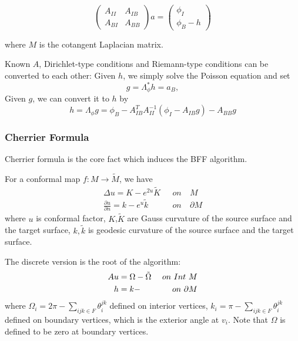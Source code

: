 \begin{equation}
\left(\begin{matrix}
A_{II} & A_{IB}\\
A_{BI} & A_{BB}
\end{matrix}\right) a
= \left(\begin{matrix}
\phi_I\\
\phi_B - h\end{matrix}\right)
\label{eq:relation}
\end{equation}

where $M$ is the cotangent Laplacian matrix.

Known $A$, Dirichlet-type conditions and Riemann-type conditions can be converted to each other: Given $h$, we simply solve the Poisson equation and set 
\begin{equation}
g = \Lambda^*_\phi h = a_B,
\end{equation}
Given $g$, we can convert it to $h$  by
\begin{equation}
h = \Lambda_\phi g = \phi_B - A_{IB}^TA_{II}^{-1}(\phi_I - A_{IB}g) - A_{BB}g
\end{equation}


\subsubsection{Cherrier Formula}
Cherrier formula \cite{CHERRIER1984154} is the core fact which induces the BFF algorithm. 

For a conformal map $f: M \rightarrow \tilde{M}$, we have 
\begin{equation}
\begin{split}
\Delta u = K - e^{2u} \tilde{K} \ \ \ &on\ &M\,\\
\frac{\partial u}{\partial n} = k - e^{u}\tilde{k} \ \ \ &on\     &\partial M
\end{split}
\end{equation}
where $u$ is conformal factor, $K$,$\tilde{K}$ are Gauss curvature of the source surface and  the target surface, $k, \tilde{k}$ is geodesic curvature of the source surface and the target surface.


The discrete version is the root of the algorithm:
\begin{equation}
\begin{split}
Au &=   \Omega - \tilde\Omega\  &on\  Int\  M\\
h &= k - \title{k}\ \  &on\ \partial M 
\end{split}
\label{eq:poisson}
\end{equation}
where $\Omega_i = 2\pi - \sum_{ijk \in F}\theta_i^{jk}$ defined on interior vertices, $k_i = \pi - \sum_{ijk \in F}\theta_i^{jk}$ defined on boundary vertices, which is the exterior angle at $v_i$. Note that $\Omega$ is defined to be zero at boundary vertices.




